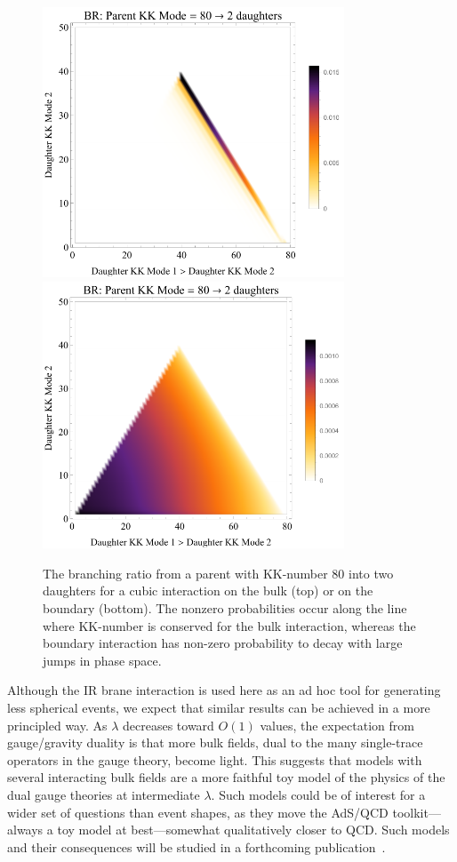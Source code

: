 \begin{enumerate}
\begin{figure}[tb!]
	\centering
	\includegraphics[width=0.8\textwidth]{figures/DS_KKBR_bulk.pdf}\vspace{1cm}
	\includegraphics[width=0.8\textwidth]{figures/DS_KKBR_boundary.pdf}
	\caption{The branching ratio from a parent with KK-number 80 into two daughters for a cubic interaction on the bulk (top) or on the boundary (bottom). The nonzero probabilities occur along the line where KK-number is conserved for the bulk interaction, whereas the boundary interaction has non-zero probability to decay with large jumps in phase space. }
	\label{fig:BR}
\end{figure}

Although the IR brane interaction is used here as an ad hoc tool for generating less spherical events, we expect that similar results can be achieved in a more principled way. As $\lambda$ decreases toward $O(1)$ values, the expectation from gauge/gravity duality is that more bulk fields, dual to the many single-trace operators in the gauge theory, become light. This suggests that models with several interacting bulk fields are a more faithful toy model of the physics of the dual gauge theories at intermediate $\lambda$. Such models could be of interest for a wider set of questions than event shapes, as they move the AdS/QCD toolkit---always a toy model at best---somewhat qualitatively closer to QCD. Such models and their consequences will be studied in a forthcoming publication~\cite{showersinprogress}.


\end{enumerate}
